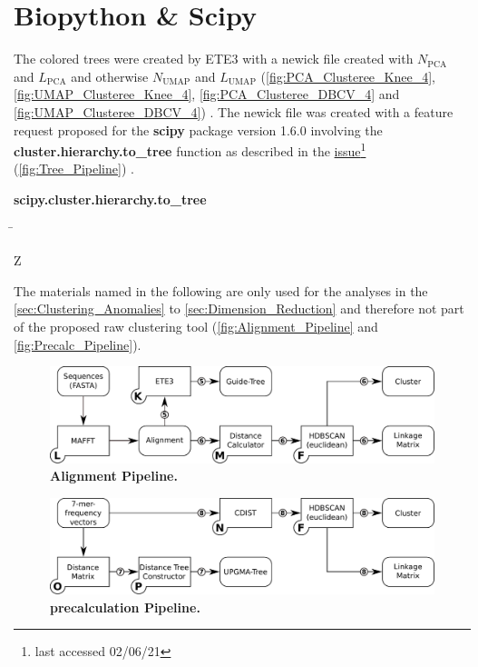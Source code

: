 \section{Biopython \& Scipy} \label{sec:MAFFT}

The colored trees were created by ETE3 with a newick file created with $N_{\text{PCA}}$ and $L_{\text{PCA}}$ and otherwise $N_{\text{UMAP}}$ and $L_{\text{UMAP}}$ (\autoref{fig:PCA_Clusteree_Knee_4}, \autoref{fig:UMAP_Clusteree_Knee_4}, \autoref{fig:PCA_Clusteree_DBCV_4} and \autoref{fig:UMAP_Clusteree_DBCV_4}) \autocite{huerta-cepas_ete_2016}. The newick file was created with a feature request proposed for the \textbf{scipy} package version 1.6.0 involving the \textbf{cluster.hierarchy.to\_tree} function as described in the \href{https://github.com/scipy/scipy/issues/8274}{issue}\footnote{last accessed 02/06/21} (\autoref{fig:Tree_Pipeline}) \autocite{scipy_10_contributors_scipy_2020}.

\begin{leftbar}
    \textbf{scipy.cluster.hierarchy.to\_tree}
    \begin{nstabbing}
        \qquad\qquad\qquad\qquad\qquad\quad\=\kill
    
        Z 
    \end{nstabbing}
\end{leftbar}

The materials named in the following are only used for the analyses in the \autoref{sec:Clustering_Anomalies} to \autoref{sec:Dimension_Reduction} and therefore not part of the proposed raw clustering tool (\autoref{fig:Alignment_Pipeline} and \autoref{fig:Precalc_Pipeline}).

\begin{figure}[!hbt]
    \centering
    \includegraphics[width=\textwidth]{Graphics/Alignment.pdf}
    \caption[Alignment Pipeline]{\textbf{Alignment Pipeline.} }
    \label{fig:Alignment_Pipeline}
\end{figure}

\begin{figure}[!hbt]
    \centering
    \includegraphics[width=\textwidth]{Graphics/Precalculated.pdf}
    \caption[Precalculation Pipeline]{\textbf{precalculation Pipeline.} }
    \label{fig:Precalc_Pipeline}
\end{figure}

